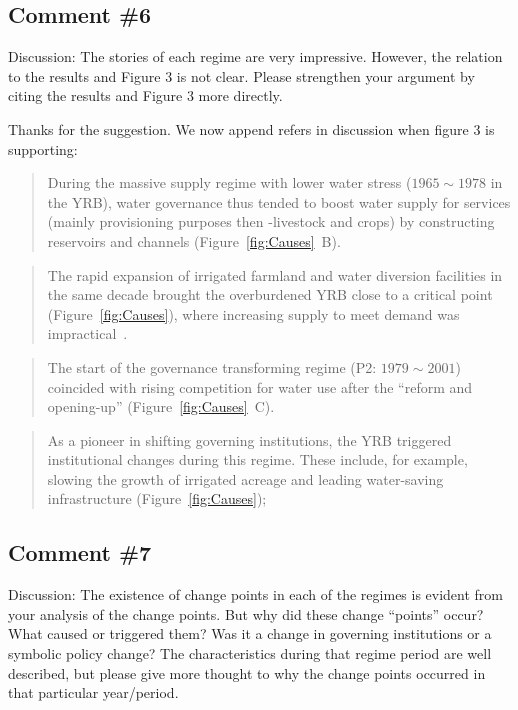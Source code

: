\subsection{Comment \#6}
\RC{} Discussion: The stories of each regime are very impressive. However, the relation to the results and Figure 3 is not clear. Please strengthen your argument by citing the results and Figure 3 more directly.

\AR{} Thanks for the suggestion. We now append refers in discussion when figure 3 is supporting:

\begin{quote}
    During the massive supply regime with lower water stress ($1965 \sim 1978$ in the YRB), water governance thus tended to boost water supply for services (mainly provisioning purposes then -livestock and crops) by constructing reservoirs and channels (Figure~\ref{fig:Causes}~B).
\end{quote}

\begin{quote}
    The rapid expansion of irrigated farmland and water diversion facilities in the same decade brought the overburdened YRB close to a critical point (Figure~\ref{fig:Causes}), where increasing supply to meet demand was impractical~\cite{loch2020}.
\end{quote}

\begin{quote}
    The start of the governance transforming regime (P2: $1979 \sim 2001$) coincided with rising competition for water use after the ``reform and opening-up'' (Figure~\ref{fig:Causes}~C).
\end{quote}

\begin{quote}
    As a pioneer in shifting governing institutions, the YRB triggered institutional changes during this regime. These include, for example, slowing the growth of irrigated acreage and leading water-saving infrastructure (Figure~\ref{fig:Causes});
\end{quote}

\subsection{Comment \#7}
\RC{} Discussion: The existence of change points in each of the regimes is evident from your analysis of the change points. But why did these change ``points'' occur? What caused or triggered them? Was it a change in governing institutions or a symbolic policy change? The characteristics during that regime period are well described, but please give more thought to why the change points occurred in that particular year/period.

